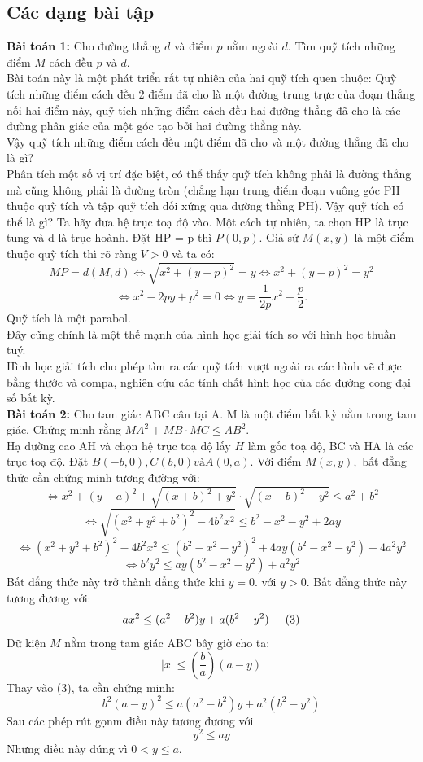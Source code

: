 \documentclass[12pt,a4]{article}
\begin{document}
\begin{titlepage}
\section{Các dạng bài tập}
\vspace{0.2cm}
\textbf{Bài toán 1:} Cho đường thẳng $d$ và điểm $p$ nằm ngoài $d$. Tìm quỹ tích những điểm $M$ cách đều $p$ và $d$.\\
Bài toán này là một phát triển rất tự nhiên của hai quỹ tích quen thuộc: Quỹ tích những điểm cách đều 2 điểm đã cho là một đường trung trực của đoạn thẳng nối hai điểm này, quỹ tích những điểm cách đều hai đường thẳng đã cho là các đường phân giác của một góc tạo bởi hai đường thẳng này.\\
Vậy quỹ tích những điểm cách đều một điểm đã cho và một đường thẳng đã cho là gì?\\
Phân tích một số vị trí đặc biệt, có thể thấy quỹ tích không phải là đường thẳng mà cũng không phải là đường tròn (chẳng hạn trung điểm đoạn vuông góc PH thuộc quỹ tích và tập quỹ tích đối xứng qua đường thằng PH). Vậy quỹ tích có thể là gì? Ta hãy đưa hệ trục toạ độ vào. Một cách tự nhiên, ta chọn HP là trục tung và d là trục hoành. Đặt HP = p thì $P(0,p)$. Giả sử $M(x,y)$ là một điểm thuộc quỹ tích thì rõ ràng $V > 0$ và ta có:
\[
MP = d(M,d) \Leftrightarrow \sqrt{x^2 + (y - p)^2} = y \Leftrightarrow x^2 + (y - p)^2 = y^2
\]
\[
\Leftrightarrow x^2 - 2py + p^2 = 0 \Leftrightarrow y = \frac{1}{2p}x^2 + \frac{p}{2}.
\]
Quỹ tích là một parabol.\\
Đây cũng chính là một thế mạnh của hình học giải tích so với hình học thuần tuý.\\
Hình học giải tích cho phép tìm ra các quỹ tích vượt ngoài ra các hình vẽ được bằng thước và compa, nghiên cứu các tính chất hình học của các đường cong đại số bất kỳ.\\
\textbf{Bài toán 2:} Cho tam giác ABC cân tại A. M là một điểm bất kỳ nằm trong tam giác. Chứng minh rằng $MA^2 + MB\cdot MC \leq AB^2.$\\
Hạ đường cao AH và chọn hệ trục toạ độ lấy $H$ làm gốc toạ độ, BC và HA là các trục toạ độ. Đặt $B(-b,0), C(b,0) và A(0,a).$ Với điểm $M(x,y),$ bất đẳng thức cần chứng minh tương đường với:
\[
\Leftrightarrow x^2 + (y - a)^2 + \sqrt{(x + b)^2 + y^2} \cdot \sqrt{(x - b)^2 + y^2} \leq a^2 + b^2
\]
\[
\Leftrightarrow \sqrt{(x^2 + y^2 + b^2)^2 -  4b^2x^2} \leq b^2 - x^2 - y^2 + 2ay
\]
\[
\Leftrightarrow (x^2 + y^2 + b^2)^2 - 4b^2x^2 \leq (b^2 - x^2 -y^2)^2 + 4ay(b^2 - x^2 - y^2) + 4a^2y^2
\]
\[
\Leftrightarrow b^2y^2 \leq ay(b^2 - x^2 - y^2) + a^2y^2
\]
Bất đẳng thức này trở thành đẳng thức khi $y = 0.$ với $y > 0.$ Bất đẳng thức này tương đương với:
\[
ax^2 \leq (a^2 - b^2)y + a(b^2 - y^2) \hspace{0.5cm} (3)
\]
Dữ kiện $M$ nằm trong tam giác ABC bây giờ cho ta:
\[
|x| \leq (\frac{b}{a})(a - y)
\]
Thay vào (3), ta cần chứng minh:
\[
b^2(a - y)^2 \leq a(a^2 - b^2)y + a^2(b^2 - y^2)
\]
Sau các phép rút gọnm điều này tương đương với
\[
y^2 \leq ay
\]
Nhưng điều này đúng vì $0 < y \leq a.$

\end{titlepage}
\end{document}

